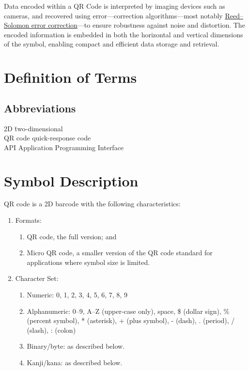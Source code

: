 \documentclass[../../1_thesis]{subfiles}
\begin{document}
Data encoded within a QR Code is interpreted by imaging devices such as cameras, and recovered using error---correction algorithms—most notably \href{https://en.wikipedia.org/wiki/Reed\%E2\%80\%93Solomon_error_correction}{Reed--Solomon error correction}---to ensure robustness against noise and distortion. The encoded information is embedded in both the horizontal and vertical dimensions of the symbol, enabling compact and efficient data storage and retrieval.\cite{wikipedia-qr}

\section{Definition of Terms}

\subsection{Abbreviations}

\begin{tabbing}
  2D \hspace{3em} \= two-dimensional \cite{mw-2d} \\
  QR code \> quick-response code \cite{wikipedia-qr} \\
  API \> Application Programming Interface \cite{wikipedia-api} \\
\end{tabbing}

\section{Symbol Description}

QR code is a 2D barcode with the following characteristics:

\begin{enumerate}
  \item Formats:
    \begin{enumerate}[label=\alph*.]
      \item QR code, the full version; and
      \item Micro QR code, a smaller version of the QR code standard for applications where symbol size is limited.
    \end{enumerate}
  \item Character Set\cite{wikipedia-qr}:
    \begin{enumerate}[label=\alph*.]
      \item Numeric: 0, 1, 2, 3, 4, 5, 6, 7, 8, 9
      \item Alphanumeric: 0–9, A–Z (upper-case only), space, \$ (dollar sign), \% (percent symbol), * (asterisk), + (plus symbol), - (dash), . (period), / (slash), : (colon) 
      \item Binary/byte:  as described below.
      \item Kanji/kana:  as described below.
    \end{enumerate}
\end{enumerate}
\end{document}
